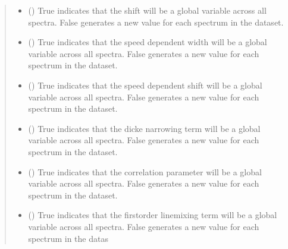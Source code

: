 \documentclass[letterpaper,10pt,english]{sphinxmanual}
\begin{document}
\begin{fulllineitems}
\begin{quote}
\begin{description}
\begin{itemize}
\item {} 
\sphinxAtStartPar
{} () \textendash{} True indicates that the shift will be a global variable across all spectra. False generates a new value for each spectrum in the dataset.

\item {} 
\sphinxAtStartPar
{} () \textendash{} True indicates that the speed dependent width will be a global variable across all spectra. False generates a new value for each spectrum in the dataset.

\item {} 
\sphinxAtStartPar
{} () \textendash{} True indicates that the speed dependent shift will be a global variable across all spectra. False generates a new value for each spectrum in the dataset.

\item {} 
\sphinxAtStartPar
{} () \textendash{} True indicates that the dicke narrowing term will be a global variable across all spectra. False generates a new value for each spectrum in the dataset.

\item {} 
\sphinxAtStartPar
{} () \textendash{} True indicates that the correlation parameter will be a global variable across all spectra. False generates a new value for each spectrum in the dataset.

\item {} 
\sphinxAtStartPar
{} () \textendash{} True indicates that the first\sphinxhyphen{}order linemixing term will be a global variable across all spectra. False generates a new value for each spectrum in the datas

\end{itemize}

\end{description}\end{quote}


\end{fulllineitems}
\end{document}
